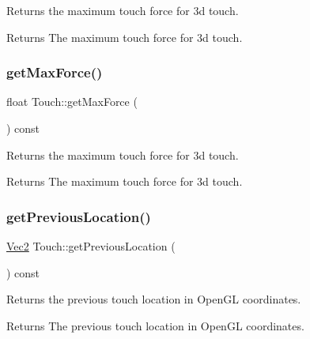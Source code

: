Returns the maximum touch force for 3d touch.

\begin{DoxyReturn}{Returns}
The maximum touch force for 3d touch. 
\end{DoxyReturn}
\mbox{\label{classTouch_a4aa254ea9e7d9dba69439b295da0ccb0}} 
\subsubsection{\texorpdfstring{get\+Max\+Force()}{getMaxForce()}\hspace{0.1cm}{\footnotesize\ttfamily [2/2]}}
{\footnotesize\ttfamily float Touch\+::get\+Max\+Force (\begin{DoxyParamCaption}{ }\end{DoxyParamCaption}) const}

Returns the maximum touch force for 3d touch.

\begin{DoxyReturn}{Returns}
The maximum touch force for 3d touch. 
\end{DoxyReturn}
\mbox{\label{classTouch_a9a03d678c1e9d637bd4b6807fbcd1fa1}} 
\subsubsection{\texorpdfstring{get\+Previous\+Location()}{getPreviousLocation()}\hspace{0.1cm}{\footnotesize\ttfamily [1/2]}}
{\footnotesize\ttfamily \hyperlink{classVec2}{Vec2} Touch\+::get\+Previous\+Location (\begin{DoxyParamCaption}{ }\end{DoxyParamCaption}) const}

Returns the previous touch location in Open\+GL coordinates.

\begin{DoxyReturn}{Returns}
The previous touch location in Open\+GL coordinates. 
\end{DoxyReturn}
\mbox{\label{classTouch_a9a03d678c1e9d637bd4b6807fbcd1fa1}} 
